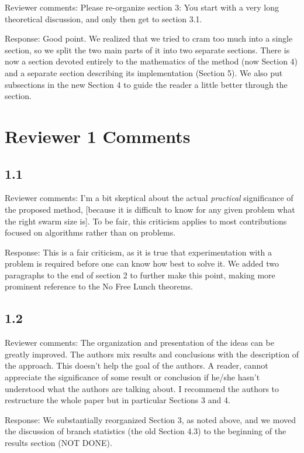 \documentclass[onecolumn, 12pt]{article}
\begin{document}
Reviewer comments: Please re-organize section 3: You start with a very long
theoretical discussion, and only then get to section 3.1.

Response: Good point.  We realized that we tried to cram too much into a single
section, so we split the two main parts of it into two separate sections.
There is now a section devoted entirely to the mathematics of the method (now
Section 4) and a separate section describing its implementation (Section 5).
We also put subsections in the new Section 4 to guide the reader a little
better through the section.

\section*{Reviewer 1 Comments}

\subsection*{1.1}

Reviewer comments: I'm a bit skeptical about the actual \emph{practical}
significance of the proposed method, [because it is difficult to know for any
given problem what the right swarm size is]. To be fair, this criticism applies
to most contributions focused on algorithms rather than on problems.

Response: This is a fair criticism, as it is true that experimentation with a
problem is required before one can know how best to solve it.  We added two
paragraphs to the end of section 2 to further make this point, making more
prominent reference to the No Free Lunch theorems.

\subsection*{1.2}

Reviewer comments: The organization and presentation of the ideas can be
greatly improved. The authors mix results and conclusions with the description
of the approach. This doesn't help the goal of the authors. A reader, cannot
appreciate the significance of some result or conclusion if he/she hasn't
understood what the authors are talking about. I recommend the authors to
restructure the whole paper but in particular Sections 3 and 4.

Response: We substantially reorganized Section 3, as noted above, and we moved
the discussion of branch statistics (the old Section 4.3) to the beginning of
the results section (NOT DONE).
\end{document}
